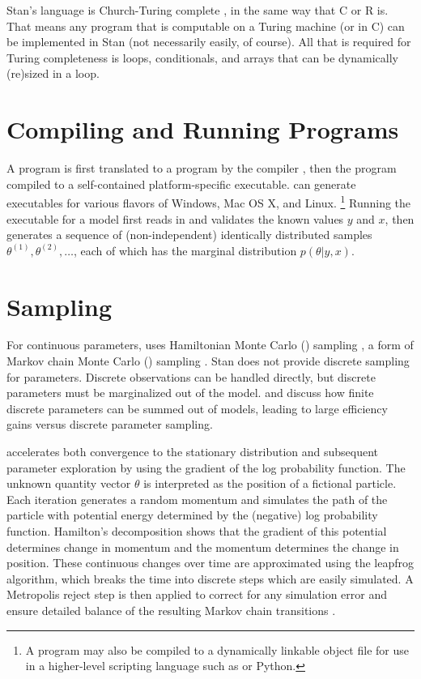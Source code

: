 Stan's language is Church-Turing complete
\cite{Church:1936,Turing:1936,HopcroftMotwani:2006}, in the same way
that C or R is.  That means any program that is computable on a Turing
machine (or in C) can be implemented in Stan (not necessarily easily,
of course).  All that is required for Turing completeness is loops,
conditionals, and arrays that can be dynamically (re)sized in a loop.

\section{Compiling and Running \Stan Programs}

A \Stan program is first translated to a \Cpp program by the \Stan
compiler \stanc, then the \Cpp program compiled to a self-contained
platform-specific executable.  \Stan can generate executables for
various flavors of Windows, Mac OS X, and Linux.%
%
\footnote{A \Stan program may also be compiled to a dynamically
  linkable object file for use in a higher-level scripting language
  such as \R or Python.}
%
Running the \Stan executable for a model first reads in and validates
the known values $y$ and $x$, then generates a sequence of
(non-independent) identically distributed samples $\theta^{(1)},
\theta^{(2)}, \ldots$, each of which has the marginal distribution
$p(\theta|y,x)$.


\section{Sampling}

For continuous parameters, \Stan uses Hamiltonian Monte Carlo (\HMC)
sampling \citep{Duane:1987, Neal:1994, Neal:2011}, a form of Markov
chain Monte Carlo (\MCMC) sampling \citep{Metropolis:1953}.  Stan does
not provide discrete sampling for parameters. Discrete observations
can be handled directly, but discrete parameters must be marginalized
out of the model.   and
 discuss how finite discrete parameters
can be summed out of models, leading to large efficiency gains versus
discrete parameter sampling.

\HMC accelerates both convergence to the stationary distribution and
subsequent parameter exploration by using the gradient of the log
probability function.  The unknown quantity vector $\theta$ is
interpreted as the position of a fictional particle.  Each iteration
generates a random momentum and simulates the path of the particle
with potential energy determined by the (negative) log probability
function.  Hamilton's decomposition shows that the gradient of this
potential determines change in momentum and the momentum determines
the change in position.  These continuous changes over time are
approximated using the leapfrog algorithm, which breaks the time into
discrete steps which are easily simulated.  A Metropolis reject step
is then applied to correct for any simulation error and ensure
detailed balance of the resulting Markov chain transitions
\citep{Metropolis:1953, Hastings:1970}.

